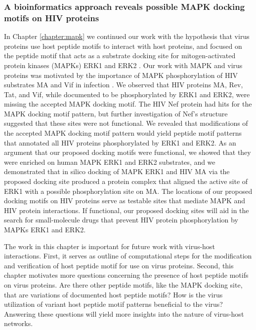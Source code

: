 
\subsubsection{A bioinformatics approach reveals possible MAPK docking motifs on HIV proteins}

In Chapter \ref{chapter:mapk} we continued our work with the
hypothesis that virus proteins use host peptide motifs to interact
with host proteins, and focused on the peptide motif that acts as a
substrate docking site for mitogen-activated protein kinases (MAPKs)
ERK1 and ERK2 \cite{bardwell09}. Our work with MAPK and virus proteins
was motivated by the importance of MAPK phosphorylation of HIV
substrates MA and Vif in infection \cite{yang99,bukrinskaya96}. We
observed that HIV proteins MA, Rev, Tat, and Vif, while documented to
be phosphorylated by ERK1 and ERK2, were missing the accepted MAPK
docking motif. The HIV Nef protein had hits for the MAPK docking motif
pattern, but further investigation of Nef's structure suggested that
these sites were not functional. We revealed that modifications of the
accepted MAPK docking motif pattern would yield peptide motif patterns
that annotated all HIV proteins phosphorylated by ERK1 and ERK2. As an
argument that our proposed docking motifs were functional, we showed
that they were enriched on human MAPK ERK1 and ERK2 substrates, and we
demonstrated that in silico docking of MAPK ERK1 and HIV MA via the
proposed docking site produced a protein complex that aligned the
active site of ERK1 with a possible phosphorylation site on MA. The
locations of our proposed docking motifs on HIV proteins serve as
testable sites that mediate MAPK and HIV protein interactions. If
functional, our proposed docking sites will aid in the search for
small-molecule drugs that prevent HIV protein phosphorylation by MAPKs
ERK1 and ERK2.

The work in this chapter is important for future work with virus-host
interactions. First, it serves as outline of computational steps for
the modification and verification of host peptide motif for use on
virus proteins. Second, this chapter motivates more questions
concerning the presence of host peptide motifs on virus proteins. Are
there other peptide motifs, like the MAPK docking site, that are
variations of documented host peptide motifs? How is the virus
utilization of variant host peptide motif patterns beneficial to the
virus? Answering these questions will yield more insights into the
nature of virus-host networks.

